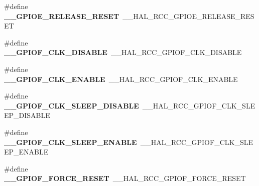 \begin{DoxyCompactItemize}
\item 
\#define {\bfseries \+\_\+\+\_\+\+G\+P\+I\+O\+E\+\_\+\+R\+E\+L\+E\+A\+S\+E\+\_\+\+R\+E\+S\+ET}~\+\_\+\+\_\+\+H\+A\+L\+\_\+\+R\+C\+C\+\_\+\+G\+P\+I\+O\+E\+\_\+\+R\+E\+L\+E\+A\+S\+E\+\_\+\+R\+E\+S\+ET\hypertarget{group___h_a_l___r_c_c___aliased_ga08a018573715830069dc9273ca69e856}{}\label{group___h_a_l___r_c_c___aliased_ga08a018573715830069dc9273ca69e856}

\item 
\#define {\bfseries \+\_\+\+\_\+\+G\+P\+I\+O\+F\+\_\+\+C\+L\+K\+\_\+\+D\+I\+S\+A\+B\+LE}~\+\_\+\+\_\+\+H\+A\+L\+\_\+\+R\+C\+C\+\_\+\+G\+P\+I\+O\+F\+\_\+\+C\+L\+K\+\_\+\+D\+I\+S\+A\+B\+LE\hypertarget{group___h_a_l___r_c_c___aliased_ga2ef7d457a77c095aa4b29d3bc8e7384c}{}\label{group___h_a_l___r_c_c___aliased_ga2ef7d457a77c095aa4b29d3bc8e7384c}

\item 
\#define {\bfseries \+\_\+\+\_\+\+G\+P\+I\+O\+F\+\_\+\+C\+L\+K\+\_\+\+E\+N\+A\+B\+LE}~\+\_\+\+\_\+\+H\+A\+L\+\_\+\+R\+C\+C\+\_\+\+G\+P\+I\+O\+F\+\_\+\+C\+L\+K\+\_\+\+E\+N\+A\+B\+LE\hypertarget{group___h_a_l___r_c_c___aliased_ga503234a173541674667d2898ed8dbca0}{}\label{group___h_a_l___r_c_c___aliased_ga503234a173541674667d2898ed8dbca0}

\item 
\#define {\bfseries \+\_\+\+\_\+\+G\+P\+I\+O\+F\+\_\+\+C\+L\+K\+\_\+\+S\+L\+E\+E\+P\+\_\+\+D\+I\+S\+A\+B\+LE}~\+\_\+\+\_\+\+H\+A\+L\+\_\+\+R\+C\+C\+\_\+\+G\+P\+I\+O\+F\+\_\+\+C\+L\+K\+\_\+\+S\+L\+E\+E\+P\+\_\+\+D\+I\+S\+A\+B\+LE\hypertarget{group___h_a_l___r_c_c___aliased_ga7f77f1d8c491f667cfe32ed10e274f94}{}\label{group___h_a_l___r_c_c___aliased_ga7f77f1d8c491f667cfe32ed10e274f94}

\item 
\#define {\bfseries \+\_\+\+\_\+\+G\+P\+I\+O\+F\+\_\+\+C\+L\+K\+\_\+\+S\+L\+E\+E\+P\+\_\+\+E\+N\+A\+B\+LE}~\+\_\+\+\_\+\+H\+A\+L\+\_\+\+R\+C\+C\+\_\+\+G\+P\+I\+O\+F\+\_\+\+C\+L\+K\+\_\+\+S\+L\+E\+E\+P\+\_\+\+E\+N\+A\+B\+LE\hypertarget{group___h_a_l___r_c_c___aliased_ga207010d823f26c276bb19983634b37ac}{}\label{group___h_a_l___r_c_c___aliased_ga207010d823f26c276bb19983634b37ac}

\item 
\#define {\bfseries \+\_\+\+\_\+\+G\+P\+I\+O\+F\+\_\+\+F\+O\+R\+C\+E\+\_\+\+R\+E\+S\+ET}~\+\_\+\+\_\+\+H\+A\+L\+\_\+\+R\+C\+C\+\_\+\+G\+P\+I\+O\+F\+\_\+\+F\+O\+R\+C\+E\+\_\+\+R\+E\+S\+ET\hypertarget{group___h_a_l___r_c_c___aliased_ga61155994f61ed0c2c6d3bc14aed0b9c4}{}\label{group___h_a_l___r_c_c___aliased_ga61155994f61ed0c2c6d3bc14aed0b9c4}


\end{DoxyCompactItemize}
